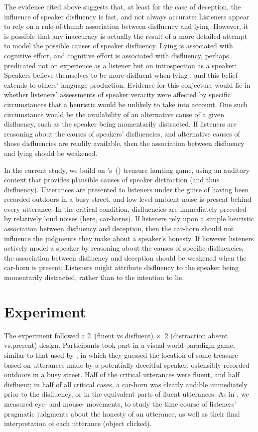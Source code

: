 \documentclass[a4paper,man,natbib]{apa6}
\newcommand*{\citegen}[1]{\citeauthor{#1}'s~(\citeyear{#1})}
\begin{document}
The evidence cited above suggests that, at least for the case of deception, the influence of speaker disfluency is fast, and not always accurate: 
Listeners appear to rely on a rule-of-thumb association between disfluency and lying.
However, it is possible that any inaccuracy is actually the result of a more detailed attempt to model the possible causes of speaker disfluency.
Lying is associated with cognitive effort, and cognitive effort is associated with disfluency, perhaps predicated not on experience as a listener but on introspection as a speaker:
Speakers believe themselves to be more disfluent when lying \citep{Zuckerman1981}, and this belief extends to others' language production.
Evidence for this conjecture would lie in whether listeners' assessments of speaker veracity were affected by specific circumstances that a heuristic would be unlikely to take into account.
One such circumstance would be the availability of an alternative cause of a given disfluency, such as the speaker being momentarily distracted.
If listeners are reasoning about the causes of speakers' disfluencies, and alternative causes of those disfluencies are readily available, then the association between disfluency and lying should be weakened.


In the current study, we build on \citegen{Loy2016} treasure hunting game, using an auditory context that provides plausible causes of speaker distraction (and thus disfluency).
Utterances are presented to listeners under the guise of having been recorded outdoors in a busy street, and low-level ambient noise is present behind every utterance.
In the critical condition, disfluencies are immediately preceded by relatively loud noises (here, car-horns).
If listeners rely upon a simple heuristic association between disfluency and deception, then the car-horn should not influence the judgments they make about a speaker's honesty.
If however listeners actively model a speaker by reasoning about the causes of specific disfluencies, the association between disfluency and deception should be weakened when the car-horn is present:
Listeners might attribute disfluency to the speaker being momentarily distracted, rather than to the intention to lie.


\section{Experiment}

The experiment followed a 2~(fluent vs.\@ disfluent) $\times$~2 (distraction absent vs.\@ present) design.
Participants took part in a visual world paradigm game, similar to that used by \citet{Loy2016}, in which they guessed the location of some treasure based on utterances made by a potentially deceitful speaker, ostensibly recorded outdoors in a busy street.
Half of the critical utterances were fluent, and half disfluent; in half of all critical cases, a car-horn was clearly audible immediately prior to the disfluency, or in the equivalent parts of fluent utterances.
As in \citet{Loy2016}, we measured eye- and mouse- movements, to study the time course of listeners' pragmatic judgments about the honesty of an utterance, as well as their final interpretation of each utterance (object clicked).
\end{document}
